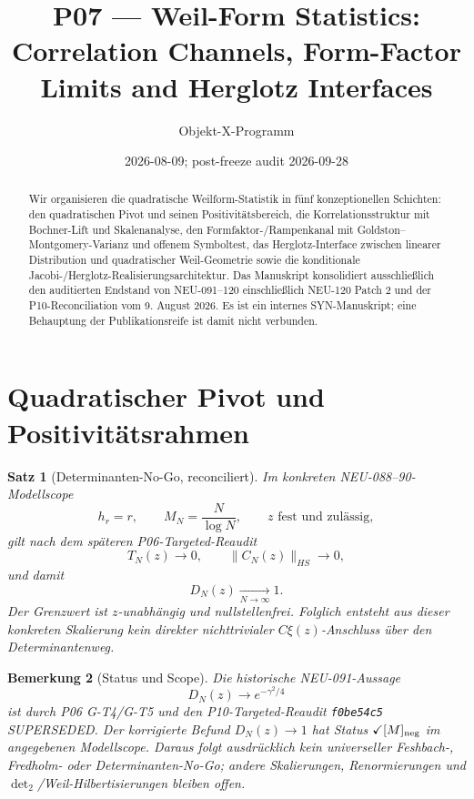 \documentclass[11pt,a4paper]{amsart}
\title[P07 --- Weil-Form Statistics]{P07 --- Weil-Form Statistics:\\
Correlation Channels, Form-Factor Limits and Herglotz Interfaces}
\author{Objekt-X-Programm}
\date{2026-08-09; post-freeze audit 2026-09-28}
\newtheorem{theorem}{Satz}[section]
\newtheorem{remark}[theorem]{Bemerkung}
\begin{document}
\begin{abstract}
Wir organisieren die quadratische Weilform-Statistik in fünf konzeptionellen
Schichten: den quadratischen Pivot und seinen Positivitätsbereich, die
Korrelationsstruktur mit Bochner-Lift und Skalenanalyse, den
Formfaktor-/Rampenkanal mit Goldston--Montgomery-Varianz und offenem Symboltest,
das Herglotz-Interface zwischen linearer Distribution und quadratischer
Weil-Geometrie sowie die konditionale Jacobi-/Herglotz-Realisierungsarchitektur.
Das Manuskript konsolidiert ausschließlich den auditierten Endstand von
NEU-091--120 einschließlich NEU-120 Patch 2 und der P10-Reconciliation vom
9. August 2026. Es ist ein internes SYN-Manuskript; eine Behauptung der
Publikationsreife ist damit nicht verbunden.
\end{abstract}

\maketitle

\section{Quadratischer Pivot und Positivitätsrahmen}

\begin{theorem}[Determinanten-No-Go, reconciliert]\label{thm:det-no-go}
Im konkreten NEU-088--90-Modellscope
\[
  h_r=r,\qquad M_N=\frac{N}{\log N},\qquad z\text{ fest und zulässig},
\]
gilt nach dem späteren P06-Targeted-Reaudit
\[
  T_N(z)\to0,\qquad \|C_N(z)\|_{HS}\to0,
\]
und damit
\[
  \boxed{D_N(z)\xrightarrow[N\to\infty]{}1.}
\]
Der Grenzwert ist $z$-unabhängig und nullstellenfrei. Folglich entsteht aus
dieser konkreten Skalierung kein direkter nichttrivialer $C\xi(z)$-Anschluss
über den Determinantenweg.
\end{theorem}

\begin{remark}[Status und Scope]
Die historische NEU-091-Aussage
\[
  D_N(z)\to e^{-\gamma^2/4}
\]
ist durch P06 G-T4/G-T5 und den P10-Targeted-Reaudit
\texttt{f0be54c5} \emph{SUPERSEDED}. Der korrigierte Befund
$D_N(z)\to1$ hat Status $\checkmark[M]_{\rm neg}$ im angegebenen
Modellscope. Daraus folgt ausdrücklich kein universeller Feshbach-, Fredholm-
oder Determinanten-No-Go; andere Skalierungen, Renormierungen und
$\det_2$/Weil-Hilbertisierungen bleiben offen.
\end{remark}
\end{document}
